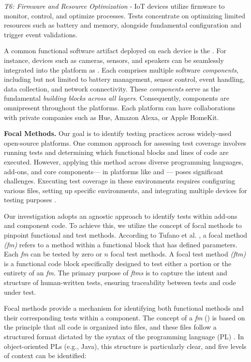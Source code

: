 \textit{T6: Firmware and Resource Optimization} - IoT devices utilize firmware to monitor, control, and optimize processes. Tests concentrate on optimizing limited resources such as battery and memory, alongside fundamental configuration and trigger event validations.

A common functional software artifact deployed on each device is the \addon. For instance, devices such as cameras, sensors, and speakers can be seamlessly integrated into the platform as \addons. Each \addon comprises multiple software \textit{components}, including but not limited to battery management, sensor control, event handling, data collection, and network connectivity. These \textit{components} serve as the fundamental \textit{building blocks across all \iot layers}. Consequently, components are omnipresent throughout the \iot platforms. Each platform can have collaborations with private companies such as Hue, Amazon Alexa, or Apple HomeKit.

\textbf{Focal Methods.} Our goal is to identify testing practices across widely-used open-source \iot platforms. One common approach for assessing test coverage involves running tests and determining which functional blocks and lines of code are executed. However, applying this method across diverse programming languages, add-ons, and core components— in \iot platforms like \openhab and \homeassistant — poses significant challenges. Executing test coverage in these environments requires configuring various files, setting up specific environments, and integrating multiple devices for testing purposes \cite{8919324,bosmans_testing_2019}.


Our investigation adopts an agnostic approach to identify tests within \iot add-ons and component code. To achieve this, we utilize the concept of focal methods to pinpoint functional and test methods. According to Tufano et al. \cite{tufano_methods2test_2022}, a focal method \textit{(fm)} refers to a method within a functional block that has defined parameters. Each \textit{fm} can be tested by zero or $n$ focal test methods. A focal test method \textit{(ftm)} is a functional code block specifically designed to test either a portion or the entirety of an \textit{fm}. The primary purpose of \textit{ftms} is to capture the intent and structure of human-written tests, ensuring traceability between tests and code under test.

Focal methods provide a mechanism for identifying both functional methods and their corresponding tests within a component. The concept of a \textit{fm} () is based on the principle that all code is organized into files, and these files follow a structured format dictated by the syntax of the programming language (PL) \cite{tufano_methods2test_2022}. In object-oriented PLs (e.g., Java), this structure is particularly clear, and five levels of context can be identified:


